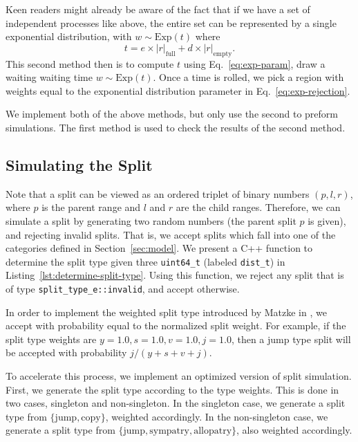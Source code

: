 \documentclass{article}
\newcommand{\CountFull}[1]{|#1|_\text{full}}
\newcommand{\CountEmpty}[1]{|#1|_\text{empty}}
\begin{document}
Keen readers might already be aware of the fact that if we have a set of
independent processes like above, the entire set can be represented by a single
exponential distribution, with \(w \sim \text{Exp}(t) \) where
\begin{equation}
	\label{eq:exp-param} t = e \times \CountFull{r} + d \times \CountEmpty{r}.
\end{equation}
This second method then is to compute \( t \) using Eq.~\ref{eq:exp-param},
draw a waiting waiting time \( w \sim \text{Exp}(t) \).
Once a time is rolled, we pick a region with weights equal to the exponential
distribution parameter in Eq.~\ref{eq:exp-rejection}.

We implement both of the above methods, but only use the second to preform
simulations.
The first method is used to check the results of the second method.

\subsection{Simulating the Split}

Note that a split can be viewed as an ordered triplet of binary numbers \(
(p,l,r) \), where $p$ is the parent range and $l$ and $r$ are the child ranges.
Therefore, we can simulate a split by generating two random numbers (the parent
split $p$ is given), and rejecting invalid splits.
That is, we accept splits which fall into one of the categories defined in
Section~\ref{sec:model}.
We present a C++ function to determine the split type given three
\texttt{uint64_t} (labeled \texttt{dist_t}) in
Listing~\ref{lst:determine-split-type}.
Using this function, we reject any split that is of type
\texttt{split_type_e::invalid}, and accept otherwise.

In order to implement the weighted split type introduced by Matzke in
\cite{ModelSelectionMatzke2014}, we accept with probability equal to the
normalized split weight.
For example, if the split type weights are $y = 1.0, s = 1.0, v = 1.0, j=1.0$,
then a jump type split will be accepted with probability $j/(y + s + v +
j)$.

To accelerate this process, we implement an optimized version of split
simulation.
First, we generate the split type according to the type weights.
This is done in two cases, singleton and non-singleton.
In the singleton case, we generate a split type from $\{\text{jump},
\text{copy}\}$, weighted accordingly.
In the non-singleton case, we generate a split type from $\{\text{jump},
\text{sympatry}, \text{allopatry}\}$, also weighted accordingly.
\end{document}
